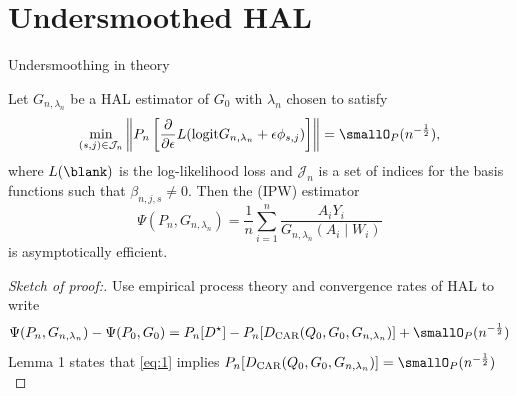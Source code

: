 \documentclass[smaller]{beamer}\usepackage{listings}
\begin{document}
\section{Undersmoothed HAL}
\label{sec:orgf291186}
\begin{frame}[label={sec:org2d04721}]{Undersmoothing in theory}
\pause
\begin{theorem}
Let \(G_{n,\lambda_n}\) be a HAL estimator of \(G_0\) with $\lambda_n$ chosen to satisfy
\begin{equation}
  \label{eq:1}
  \min_{(s,j) \in \mathcal{J}_n}\left\Vert P_n 
  \left[
    \frac{\partial }{\partial \epsilon} L(\mathrm{logit} G_{n, \lambda_n} + \epsilon \phi_{s,j}) 
  \right] 
\right\Vert = \smallO_P(n^{- \frac 1 2}),
\end{equation}
where $L(\blank)$ is the log-likelihood loss and $\mathcal{J}_n$ is a set of indices for the basis
functions such that $\beta_{n,j,s} \not = 0$. Then the (IPW) estimator
\begin{equation*}
  \Psi(P_n, G_{n, \lambda_n}) = \frac{1}{n}\sum_{i=1}^{n}\frac{A_iY_i}{G_{n,\lambda_n}(A_i \mid W_i)}
\end{equation*}
is asymptotically efficient. \pause
\end{theorem}

\begin{proof}[Sketch of proof:]
Use empirical process theory and convergence rates of HAL to write
\begin{equation*}
  \Psi(P_n, G_{n, \lambda_n}) - \Psi(P_0, G_0) = P_n[D^{\star}]
  - P_n[D_{\text{CAR}}(Q_0, G_0, G_{n,\lambda_n})] + \smallO_P(n^{- \frac 1 2})
\end{equation*}
\pause Lemma 1 states that \eqref{eq:1} implies \(P_n[D_{\text{CAR}}(Q_0, G_0, G_{n,\lambda_n})] =
\smallO_P(n^{- \frac 1 2})\)
\end{proof}
\end{frame}
\end{document}
